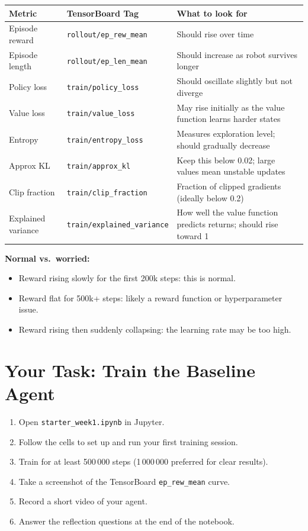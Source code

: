 \documentclass[12pt, a4paper]{article}
\begin{document}
\begin{center}
\begin{tabular}{lll}
    \toprule
    Metric & TensorBoard Tag & What to look for \\
    \midrule
    Episode reward & \texttt{rollout/ep\_rew\_mean} & Should rise over time \\
    Episode length & \texttt{rollout/ep\_len\_mean} & Should increase as robot survives longer \\
    Policy loss & \texttt{train/policy\_loss} & Should oscillate slightly but not diverge \\
    Value loss & \texttt{train/value\_loss} & May rise initially as the value function learns harder states \\
    Entropy & \texttt{train/entropy\_loss} & Measures exploration level; should gradually decrease \\
    Approx KL & \texttt{train/approx\_kl} & Keep this below 0.02; large values mean unstable updates \\
    Clip fraction & \texttt{train/clip\_fraction} & Fraction of clipped gradients (ideally below 0.2) \\
    Explained variance & \texttt{train/explained\_variance} & How well the value function predicts returns; should rise toward 1 \\
    \bottomrule
\end{tabular}
\end{center}

\textbf{Normal vs.\ worried:}
\begin{itemize}
    \item Reward rising slowly for the first 200k steps: this is normal.
    \item Reward flat for 500k+ steps: likely a reward function or hyperparameter issue.
    \item Reward rising then suddenly collapsing: the learning rate may be too high.
\end{itemize}

\section{Your Task: Train the Baseline Agent}\label{sec:baseline}

\begin{enumerate}
    \item Open \texttt{starter\_week1.ipynb} in Jupyter.
    \item Follow the cells to set up and run your first training session.
    \item Train for at least 500\,000 steps (1\,000\,000 preferred for clear results).
    \item Take a screenshot of the TensorBoard \texttt{ep\_rew\_mean} curve.
    \item Record a short video of your agent.
    \item Answer the reflection questions at the end of the notebook.
\end{enumerate}
\end{document}
